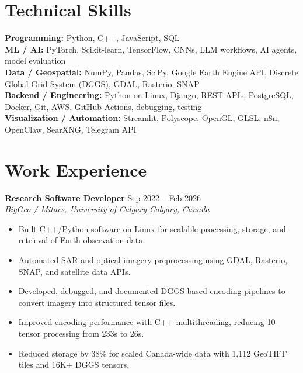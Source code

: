 \documentclass[a4paper,10pt]{article}
\newcommand{\resumeSubheading}[4]{
    \textbf{#1} \hfill #2 \\
    \textit{#3} \hfill \textit{#4}
}
\begin{document}
\section*{Technical Skills}

\textbf{Programming:} Python, C++, JavaScript, SQL \\
\textbf{ML / AI:} PyTorch, Scikit-learn, TensorFlow, CNNs, LLM workflows, AI agents, model evaluation \\
\textbf{Data / Geospatial:} NumPy, Pandas, SciPy, Google Earth Engine API, Discrete Global Grid System (DGGS), GDAL, Rasterio, SNAP \\
\textbf{Backend / Engineering:} Python on Linux, Django, REST APIs, PostgreSQL, Docker, Git, AWS, GitHub Actions, debugging, testing \\
\textbf{Visualization / Automation:} Streamlit, Polyscope, OpenGL, GLSL, n8n, OpenClaw, SearXNG, Telegram API


\section*{Work Experience}

\resumeSubheading
{Research Software Developer}
{Sep 2022 -- Feb 2026}
{\href{https://biggeo.com}{BigGeo} / \href{https://www.mitacs.ca/}{Mitacs}, University of Calgary}
{Calgary, Canada}
\begin{itemize}[leftmargin=0.25in]
    \item Built C++/Python software on Linux for scalable processing, storage, and retrieval of Earth observation data.
    \item Automated SAR and optical imagery preprocessing using GDAL, Rasterio, SNAP, and satellite data APIs.
    \item Developed, debugged, and documented DGGS-based encoding pipelines to convert imagery into structured tensor files.
    \item Improved encoding performance with C++ multithreading, reducing 10-tensor processing from 233s to 26s.
    \item Reduced storage by 38\% for scaled Canada-wide data with 1,112 GeoTIFF tiles and 16K+ DGGS tensors.
\end{itemize}
\end{document}

